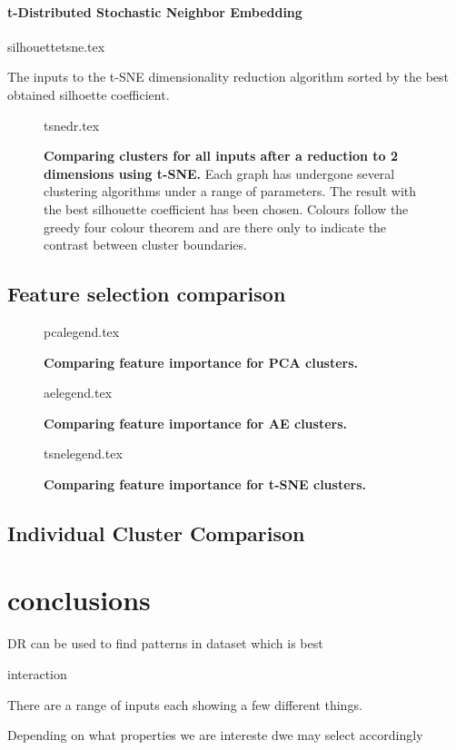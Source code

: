 \paragraph*{t-Distributed Stochastic Neighbor Embedding}

\begin{table}[H]
    \centering
        {silhouettetsne.tex}
        \caption{The inputs to the t-SNE dimensionality reduction algorithm sorted by the best obtained silhoette coefficient.  }
        \label{tab:tsnesil}
\end{table}




\begin{landscape}
\begin{figure}[H]
    {tsnedr.tex}
    \caption{\textbf{Comparing clusters for all inputs after a reduction to 2 dimensions using t-SNE.}
    Each graph has undergone several clustering algorithms under a range of parameters. The result with the best silhouette coefficient has been chosen. Colours follow the greedy four colour theorem and are there only to indicate the contrast between cluster boundaries.}
    \label{fig:tsnevis}
\end{figure}
\end{landscape}



\subsection{Feature selection comparison}\label{sec:fsclust}

\begin{figure}[H]
    {pcalegend.tex}
    \caption{\textbf{Comparing feature importance for PCA clusters.}}
    \label{fig:pcalegend}
\end{figure}


\begin{figure}[H]
    {aelegend.tex}
    \caption{\textbf{Comparing feature importance for AE clusters.}}
    \label{fig:aelegend}
\end{figure}
\begin{figure}[H]
    {tsnelegend.tex}
    \caption{\textbf{Comparing feature importance for t-SNE clusters.}}
    \label{fig:tsnelegend}
\end{figure}


\subsection{Individual Cluster Comparison}\label{sec:selectcomp}



\section{conclusions}

DR can be used to find patterns in dataset
which is best 

interaction

There are a range of inputs 
each showing a few different things. 

Depending on what properties we are intereste dwe may select accordingly 

